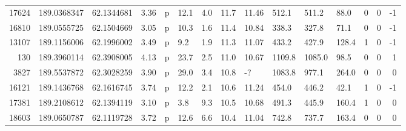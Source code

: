 \begin{tabular}{|r|l|l|l|l|l|l|l|l|l|l|l|r|r|r|}
  17624 & 189.0368347 & 62.1344681 & 3.36 & p & 12.1 & 4.0 & 11.7 & 11.46 & 512.1 & 511.2 & 88.0 & 0 & 0 & -1\\
  16810 & 189.0555725 & 62.1504669 & 3.05 & p & 10.3 & 1.6 & 11.4 & 10.84 & 338.3 & 327.8 & 71.1 & 0 & 0 & -1\\
  13107 & 189.1156006 & 62.1996002 & 3.49 & p & 9.2 & 1.9 & 11.3 & 11.07 & 433.2 & 427.9 & 128.4 & 1 & 0 & -1\\
  130 & 189.3960114 & 62.3908005 & 4.13 & p & 23.7 & 2.5 & 11.0 & 10.67 & 1109.8 & 1085.0 & 98.5 & 0 & 0 & 1\\
  3827 & 189.5537872 & 62.3028259 & 3.90 & p & 29.0 & 3.4 & 10.8 & -? & 1083.8 & 977.1 & 264.0 & 0 & 0 & 0\\
  16121 & 189.1436768 & 62.1616745 & 3.74 & p & 12.2 & 2.1 & 10.6 & 11.24 & 454.0 & 446.2 & 42.1 & 1 & 0 & -1\\
  17381 & 189.2108612 & 62.1394119 & 3.10 & p & 3.8 & 9.3 & 10.5 & 10.68 & 491.3 & 445.9 & 160.4 & 1 & 0 & 0\\
  18603 & 189.0650787 & 62.1119728 & 3.72 & p & 12.6 & 6.6 & 10.4 & 11.04 & 742.8 & 737.7 & 163.4 & 0 & 0 & 0\\
\hline\end{tabular}
